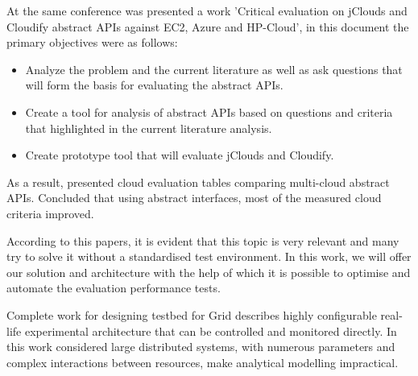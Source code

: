 At the same conference was presented a work 'Critical evaluation on jClouds and Cloudify\cite{cloudify} abstract APIs against EC2, Azure and HP-Cloud'\cite{DBLP:conf/compsac/GrahamL14}, in this document the primary objectives were as follows:
\begin{itemize}
\item Analyze the problem and the current literature as well as ask questions that will form the basis for evaluating the abstract APIs. 
\item Create a tool for analysis of abstract APIs based on questions and criteria that highlighted in the current literature analysis. 
\item Create prototype tool that will evaluate jClouds and Cloudify. 
\end{itemize}
As a result, presented cloud evaluation tables comparing multi-cloud abstract APIs. Concluded that using abstract interfaces, most of the measured cloud criteria improved.

According to this papers, it is evident that this topic is very relevant and many try to solve it without a standardised test environment. In this work, we will offer our solution and architecture with the help of which it is possible to optimise and automate the evaluation performance tests.

Complete work for designing testbed for Grid\cite{DBLP:journals/ijhpca/BolzeCCDDJJLLMMNPQRTT06} describes highly configurable real-life experimental architecture that can be controlled and monitored directly. In this work considered large distributed systems, with numerous parameters and complex interactions between resources, make analytical modelling impractical.
